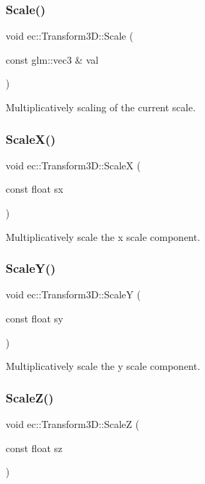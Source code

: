 \subsubsection{\texorpdfstring{Scale()}{Scale()}}
{\footnotesize\ttfamily void ec\+::\+Transform3\+D\+::\+Scale (\begin{DoxyParamCaption}\item[{const glm\+::vec3 \&}]{val }\end{DoxyParamCaption})}

Multiplicatively scaling of the current scale. \mbox{\label{classec_1_1_transform3_d_a17289ae542625db691f2d4944c8213fb}} 
\subsubsection{\texorpdfstring{Scale\+X()}{ScaleX()}}
{\footnotesize\ttfamily void ec\+::\+Transform3\+D\+::\+ScaleX (\begin{DoxyParamCaption}\item[{const float}]{sx }\end{DoxyParamCaption})}

Multiplicatively scale the x scale component. \mbox{\label{classec_1_1_transform3_d_a8b85b17f0879d8f5f0f14746d6a13f51}} 
\subsubsection{\texorpdfstring{Scale\+Y()}{ScaleY()}}
{\footnotesize\ttfamily void ec\+::\+Transform3\+D\+::\+ScaleY (\begin{DoxyParamCaption}\item[{const float}]{sy }\end{DoxyParamCaption})}

Multiplicatively scale the y scale component. \mbox{\label{classec_1_1_transform3_d_aabfade728cf9193d14ab5e726c8ddd0f}} 
\subsubsection{\texorpdfstring{Scale\+Z()}{ScaleZ()}}
{\footnotesize\ttfamily void ec\+::\+Transform3\+D\+::\+ScaleZ (\begin{DoxyParamCaption}\item[{const float}]{sz }\end{DoxyParamCaption})}


